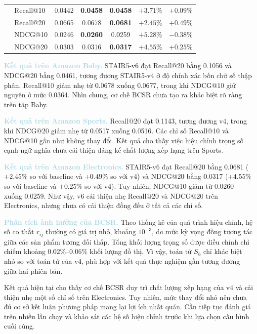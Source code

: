 \begin{table}[!htbp]
{\begin{tabular}{llccccc}
        & Recall@10 & 0.0442 & \textbf{0.0458} & \textbf{0.0458} & $+3.71\%$ & $+0.09\%$ \\
        & Recall@20 & 0.0665 & 0.0678 & \textbf{0.0681} & $+2.45\%$ & $+0.49\%$ \\
        & NDCG@10 & 0.0246 & \textbf{0.0260} & 0.0259 & $+5.28\%$ & $-0.38\%$ \\
        & NDCG@20 & 0.0303 & 0.0316 & \textbf{0.0317} & $+4.55\%$ & $+0.25\%$ \\

        \bottomrule
    \end{tabular}%
    }
\end{table}

\noindent\textcolor{lightblue}{\textbf{Kết quả trên Amazon Baby.}} STAIR5-v6 đạt Recall@20 bằng 0.1056 và NDCG@20 bằng 0.0461, tương đương STAIR5-v4 ở độ chính xác bốn chữ số thập phân. Recall@10 giảm nhẹ từ 0.0678 xuống 0.0677, trong khi NDCG@10 giữ nguyên ở mức 0.0364. Nhìn chung, cơ chế BCSR chưa tạo ra khác biệt rõ ràng trên tập Baby.

\noindent\textcolor{lightblue}{\textbf{Kết quả trên Amazon Sports.}} Recall@20 đạt 0.1143, tương đương v4, trong khi NDCG@20 giảm nhẹ từ 0.0517 xuống 0.0516. Các chỉ số Recall@10 và NDCG@10 gần như không thay đổi. Kết quả cho thấy việc hiệu chỉnh trọng số cạnh ngữ nghĩa chưa cải thiện đáng kể chất lượng xếp hạng trên Sports.

\noindent\textcolor{lightblue}{\textbf{Kết quả trên Amazon Electronics.}} STAIR5-v6 đạt Recall@20 bằng 0.0681 ($+2.45\%$ so với baseline và $+0.49\%$ so với v4) và NDCG@20 bằng 0.0317 ($+4.55\%$ so với baseline và $+0.25\%$ so với v4). Tuy nhiên, NDCG@10 giảm từ 0.0260 xuống 0.0259. Như vậy, v6 cải thiện nhẹ Recall@20 và NDCG@20 trên Electronics, nhưng chưa có cải thiện đồng đều ở tất cả các chỉ số.

\noindent\textcolor{lightblue}{\textbf{Phân tích ảnh hưởng của BCSR.}} Theo thống kê của quá trình hiệu chỉnh, hệ số co thắt $r_{ij}$ thường có giá trị nhỏ, khoảng $10^{-3}$, do mức kỳ vọng đồng tương tác giữa các sản phẩm tương đối thấp. Tổng khối lượng trọng số được điều chỉnh chỉ chiếm khoảng $0.02\%$--$0.06\%$ khối lượng đồ thị. Vì vậy, toán tử $S_6$ chỉ khác biệt nhỏ so với toán tử của v4, phù hợp với kết quả thực nghiệm gần tương đương giữa hai phiên bản.

Kết quả hiện tại cho thấy cơ chế BCSR duy trì chất lượng xếp hạng của v4 và cải thiện nhẹ một số chỉ số trên Electronics. Tuy nhiên, mức thay đổi nhỏ nên chưa đủ cơ sở kết luận phương pháp mang lại lợi ích nhất quán. Cần tiếp tục đánh giá trên nhiều lần chạy và khảo sát các hệ số hiệu chỉnh trước khi lựa chọn cấu hình cuối cùng.


